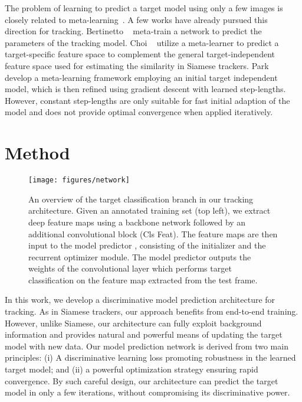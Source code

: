 \documentclass[10pt,twocolumn,letterpaper]{article}
\begin{document}
The problem of learning to predict a target model using only a few images is closely related to meta-learning~\cite{Finn2017MAML,Munkhdalai2017MetaN,Naik1992MetaneuralNT,Ravi2017OptimizationAA,schmidhuber1987srl,Schmidhuber1992LCF,Thrun1998Learningtolearn}. A few works have already pursued this direction for tracking. Bertinetto \etal~\cite{Bertinetto2016LearningFO} meta-train a network to predict the parameters of the tracking model.  
Choi \etal~\cite{DeepMetaLearning} utilize a meta-learner to predict a target-specific feature space to complement the general target-independent feature space used for estimating the similarity in Siamese trackers. 
Park \etal~\cite{MetaTracker} develop a meta-learning framework employing an initial target independent model, which is then refined using gradient descent with learned step-lengths.
However, constant step-lengths are only suitable for fast initial adaption of the model and does not provide optimal convergence when applied iteratively. 
 \section{Method}

\begin{figure*}[t]
	\centering \newcommand{\wid}{0.75\textwidth}\texttt{[image: figures/network]}\caption{An overview of the target classification branch in our tracking architecture. Given an annotated training set (top left), we extract deep feature maps using a backbone network followed by an additional convolutional block (Cls Feat). The feature maps are then input to the model predictor , consisting of the initializer and the recurrent optimizer module. The model predictor outputs the weights of the convolutional layer which performs target classification on the feature map extracted from the test frame.}\label{fig:method}\vspace{-3mm}
\end{figure*}

In this work, we develop a discriminative model prediction architecture for tracking. As in Siamese trackers, our approach benefits from end-to-end training. However, unlike Siamese, our architecture can fully exploit background information and provides natural and powerful means of updating the target model with new data. Our model prediction network is derived from two main principles: (i) A discriminative learning loss promoting robustness in the learned target model; and (ii) a powerful optimization strategy ensuring rapid convergence. By such careful design, our architecture can predict the target model in only a few iterations, without compromising its discriminative power.
\end{document}
